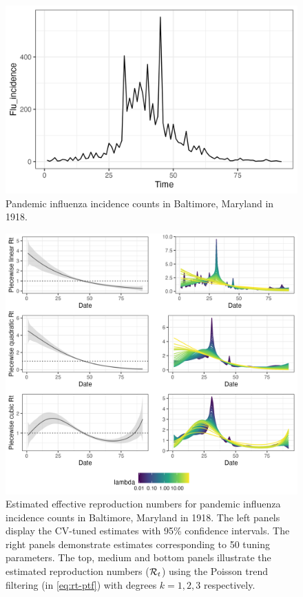 \begin{figure}[tb]
    \centering
    \includegraphics[width=0.9\linewidth]{fig/flu_dat.png}
    \caption{Pandemic influenza incidence counts in Baltimore, Maryland in 1918.} 
    \label{fig:flu-dat}
\end{figure} 

\begin{figure}[tb]
    \centering
    \includegraphics[width=0.9\linewidth]{fig/flu_full_res.png}
    \caption{Estimated effective reproduction numbers for pandemic influenza incidence counts in Baltimore, Maryland in 1918. The left panels display the CV-tuned estimates with 95\% confidence intervals. The right panels demonstrate estimates corresponding to 50 tuning parameters. The top, medium and bottom panels illustrate the estimated reproduction numbers ($\mathcal{R}_t$) using the Poisson trend filtering (in \eqref{eq:rt-ptf}) with degrees $k=1,2,3$ respectively.} 
    \label{fig:flu-res}
\end{figure} 

